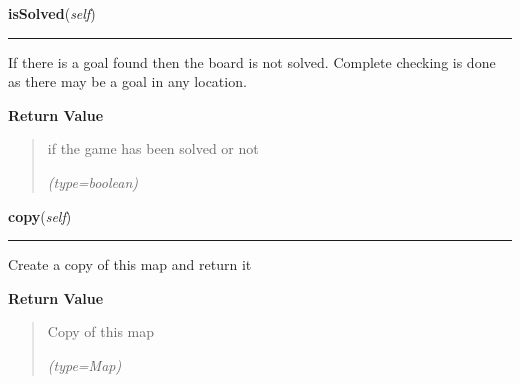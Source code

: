     \label{UnBlockMe:Map:Map:Map:isSolved}

    \vspace{0.5ex}

\hspace{.8\funcindent}\begin{boxedminipage}{\funcwidth}

    \raggedright \textbf{isSolved}(\textit{self})

    \vspace{-1.5ex}

    \rule{\textwidth}{0.5\fboxrule}
\setlength{\parskip}{2ex}
    If there is a goal found then the board is not solved. Complete 
    checking is done as there may be a goal in any location.

\setlength{\parskip}{1ex}
      \textbf{Return Value}
    \vspace{-1ex}

      \begin{quote}
      if the game has been solved or not

      {\it (type=boolean)}

      \end{quote}

    \end{boxedminipage}

    \label{UnBlockMe:Map:Map:Map:copy}

    \vspace{0.5ex}

\hspace{.8\funcindent}\begin{boxedminipage}{\funcwidth}

    \raggedright \textbf{copy}(\textit{self})

    \vspace{-1.5ex}

    \rule{\textwidth}{0.5\fboxrule}
\setlength{\parskip}{2ex}
    Create a copy of this map and return it

\setlength{\parskip}{1ex}
      \textbf{Return Value}
    \vspace{-1ex}

      \begin{quote}
      Copy of this map

      {\it (type=Map)}

      \end{quote}

    \end{boxedminipage}

